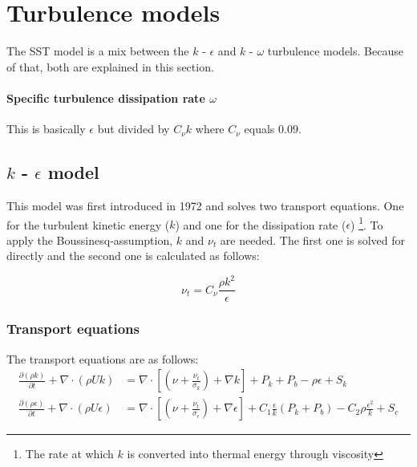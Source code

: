 \section{Turbulence models}
\label{sec:turb_models}
The SST model is a mix between the $k$ - $\epsilon$ and $k$ - $\omega$
turbulence models. Because of that, both are explained in this section. 

\paragraph{Specific turbulence dissipation rate $\omega$}
This is basically $\epsilon$ but divided by $C_{\nu} k$ where $C_{\nu}$ equals
$0.09$.




\subsection{$k$ - $\epsilon$ model}
This model was first introduced in 1972 and solves two transport equations.
\cite{JONES1972301} One for the turbulent kinetic energy ($k$) and one for the
dissipation rate ($\epsilon$) \footnote{The rate at which $k$ is converted into
thermal energy through viscosity}. To apply the Boussinesq-assumption, $k$ and
$\nu_t$ are needed. The first one is solved for directly and the second one is
calculated as follows:

\begin{equation}
    \label{eq:k_epsilon_nu_t}
    \nu_t = C_{\nu} \frac{\rho k^2}{\epsilon}
\end{equation}


\subsubsection{Transport equations}
\noindent The transport equations are as follows:
\begin{align}
    \label{eq:transport_k}
    \frac{\partial (\rho k)}{\partial t} + 
    \nabla \cdot (\rho U k) &=
    \nabla \cdot \left[ 
        \left( \nu + \frac{\nu_t}{\sigma_k}\right) + \nabla k 
    \right] + P_k + P_b - \rho \epsilon + S_k \\
%
    \frac{\partial (\rho \epsilon)}{\partial t} + 
    \nabla \cdot (\rho U \epsilon) &=
    \nabla \cdot \left[ 
        \left( \nu + \frac{\nu_t}{\sigma_{\epsilon}}\right) + \nabla  \epsilon
    \right] + C_1 \frac{\epsilon}{k}(P_k + P_b) - 
    C_2 \rho \frac{\epsilon^2}{k} + S_c
\end{align}

